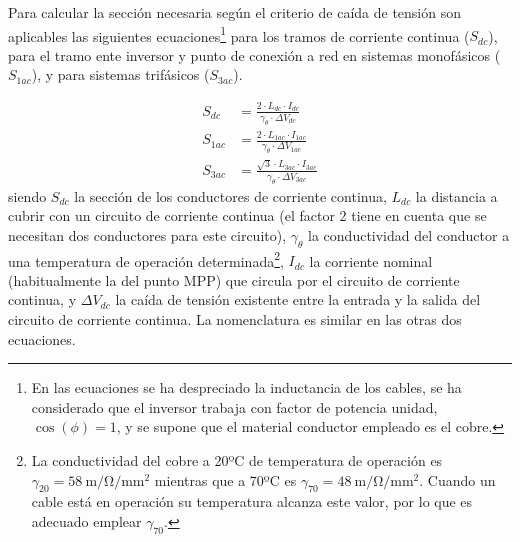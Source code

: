 Para calcular la sección necesaria según el criterio de caída de
tensión son aplicables las siguientes ecuaciones\footnote{En las ecuaciones se ha despreciado la inductancia de los
  cables, se ha considerado que el inversor trabaja con factor de
  potencia unidad,
  $\cos(\phi)=1$, y se supone que el material
  conductor empleado es el cobre. %
} para los tramos de
corriente continua ($S_{dc}$), para el tramo ente
inversor y punto de conexión a red en sistemas monofásicos ($S_{1ac}$), y para sistemas trifásicos ($S_{3ac}$).

\begin{align}
    S_{dc} &= \frac{2 \cdot L_{dc}\cdot I_{dc}}{\gamma_\theta \cdot \Delta V_{dc}}\\
    S_{1ac} &= \frac{2\cdot L_{1ac}\cdot I_{1ac}}{\gamma_\theta \cdot \Delta V_{1ac}}\\
    S_{3ac} &= \frac{\sqrt{3} \cdot L_{3ac}\cdot I_{3ac}}{\gamma_\theta \cdot \Delta V_{3ac}}
\end{align}
siendo $S_{dc}$ la sección de los conductores de corriente continua,
$L_{dc}$ la distancia a cubrir con un circuito de corriente continua
(el factor 2 tiene en cuenta que se necesitan dos conductores para
este circuito), $\gamma_\theta$ la conductividad del conductor a una temperatura
de operación determinada\footnote{La conductividad del cobre a 20ºC de
  temperatura de operación es $\gamma_{20} =\SI{58}{\meter\per\ohm\per\milli\meter\squared}$ mientras que a 70ºC es
$\gamma_{70} = \SI{48}{\meter\per\ohm\per\milli\meter\squared}$. Cuando un cable está en operación su temperatura alcanza este valor, por lo que es adecuado emplear $\gamma_{70}$.},
$I_{dc}$ la corriente nominal (habitualmente la del punto MPP) que
circula por el circuito de corriente continua, y $\Delta V_{dc}$ la
caída de tensión existente entre la entrada y la salida del circuito
de corriente continua. La nomenclatura es similar en las otras dos
ecuaciones.


